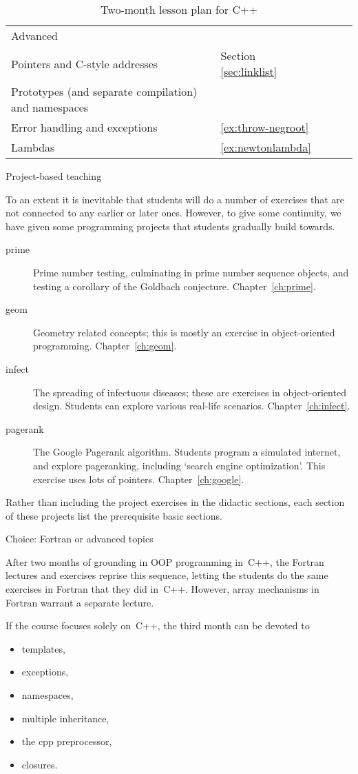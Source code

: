\begin{table}[ht]
\begin{tabular}{|l|p{\colwidth}|p{\colwidth}p{\colwidth}p{\colwidth}p{\colwidth}|}
        &&&&\\
    \hline
    \multicolumn{2}{|p{2in}|}{Advanced}\\
    \hline
    \multicolumn{2}{|p{2in}|}{Pointers and C-style addresses}
        &Section \ref{sec:linklist}&&&\\
    \multicolumn{2}{|p{2in}|}{Prototypes (and separate compilation)
      and namespaces}
        &&&&\\
    \multicolumn{2}{|p{2in}|}{Error handling and exceptions}
        &\ref{ex:throw-negroot}&&&\\
    \multicolumn{2}{|p{2in}|}{Lambdas}
        &\ref{ex:newtonlambda}&&&\\
    \hline
  \end{tabular}
  \caption{Two-month lesson plan for C++}
  \label{tab:c++plan}
\end{table}

 {Project-based teaching}

To an extent it is inevitable that students will do a number of
exercises that are not connected to any earlier or later ones.
However, to give some continuity, we have given some programming
projects that students gradually build towards.

\begin{description}
\item[prime] Prime number testing, culminating in prime number
  sequence objects, and testing a corollary of the Goldbach
  conjecture. Chapter~\ref{ch:prime}.
\item[geom] Geometry related concepts; this is mostly an exercise in
  object-oriented programming. Chapter~\ref{ch:geom}.
\item[infect] The spreading of infectuous diseases; these are
  exercises in object-oriented design. Students can explore various
  real-life scenarios. Chapter~\ref{ch:infect}.
\item[pagerank] The Google Pagerank algorithm. Students program a
  simulated internet, and explore pageranking, including `search
  engine optimization'. This exercise uses lots of
  pointers. Chapter~\ref{ch:google}.
\end{description}

Rather than including the project exercises in the didactic sections,
each section of these projects list the prerequisite basic sections.

 {Choice: Fortran or advanced topics}

After two months of grounding in OOP programming in~C++, the Fortran
lectures and exercises reprise this sequence, letting the students do
the same exercises in Fortran that they did in~C++.  However, array
mechanisms in Fortran warrant a separate lecture.

If the course focuses solely on~C++, the third month can be devoted to
\begin{itemize}
\item templates,
\item exceptions,
\item namespaces,
\item multiple inheritance,
\item the cpp preprocessor,
\item closures.
\end{itemize}

